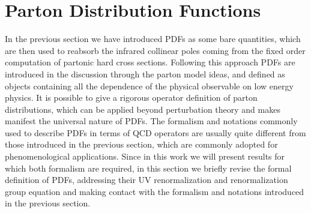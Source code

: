 \section{Parton Distribution Functions}
In the previous section we have introduced PDFs as some bare quantities,
which are then used to reabsorb the infrared collinear poles coming from the fixed order computation of partonic
hard cross sections. Following this approach PDFs are introduced in the discussion through 
the parton model ideas, and defined as objects containing all the dependence 
of the physical observable on low energy physics. 
%
It is possible to give a rigorous operator definition of parton distributions,
which can be applied beyond perturbation theory and makes manifest the universal nature of PDFs.
The formalism and notations commonly used to describe PDFs in terms of QCD operators are usually quite different
from those introduced in the previous section, which are commonly adopted for phenomenological applications.
Since in this work we will present results for which both formalism are required,
in this section we briefly revise the formal definition of PDFs, addressing their UV renormalization
and renormalization group equation and making contact with the formalism and notations introduced in the previous section.

